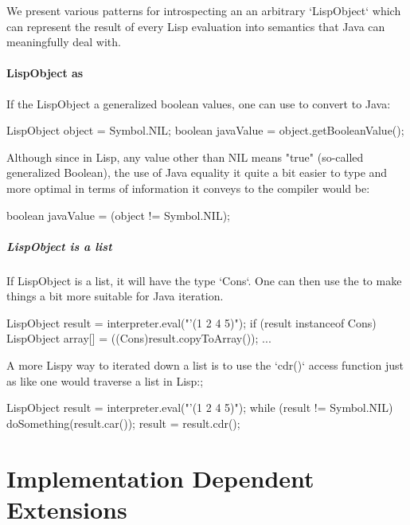 \documentclass[10pt]{book}
\begin{document}
We present various patterns for introspecting an an arbitrary
`LispObject` which can represent the result of every Lisp evaluation
into semantics that Java can meaningfully deal with.

\subsubsection{LispObject as }

If the LispObject a generalized boolean values, one can use
 to convert to Java:

\begin{listing-java}
     LispObject object = Symbol.NIL;
     boolean javaValue = object.getBooleanValue();
\end{listing-java}

Although since in Lisp, any value other than NIL means "true"
(so-called generalized Boolean), the use of Java equality it quite a
bit easier to type and more optimal in terms of information it conveys
to the compiler would be:

\begin{listing-java}
    boolean javaValue = (object != Symbol.NIL);
\end{listing-java}

\paragraph{LispObject is a list}

If LispObject is a list, it will have the type `Cons`.  One can then use
the  to make things a bit more suitable for Java
iteration.

\begin{listing-java}
    LispObject result = interpreter.eval("'(1 2 4 5)");
    if (result instanceof Cons) {
      LispObject array[] = ((Cons)result.copyToArray());
      ...
    }
\end{listing-java}
    
A more Lispy way to iterated down a list is to use the `cdr()` access
function just as like one would traverse a list in Lisp:;

\begin{listing-java}
    LispObject result = interpreter.eval("'(1 2 4 5)");
    while (result != Symbol.NIL) {
      doSomething(result.car());
      result = result.cdr();
    }
\end{listing-java}

\chapter{Implementation Dependent Extensions}
\end{document}
